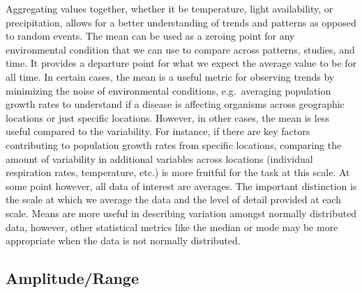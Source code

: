 \documentclass[12pt,twoside]{reedthesis}
\begin{document}
Aggregating values together, whether it be temperature, light availability, or precipitation, allows for a better understanding of trends and patterns as opposed to random events. The mean can be used as a zeroing point for any environmental condition that we can use to compare across patterns, studies, and time. It provides a departure point for what we expect the average value to be for all time. In certain cases, the mean is a useful metric for observing trends by minimizing the noise of environmental conditions, e.g.~averaging population growth rates to understand if a disease is affecting organisms across geographic locations or just specific locations. However, in other cases, the mean is less useful compared to the variability. For instance, if there are key factors contributing to population growth rates from specific locations, comparing the amount of variability in additional variables across locations (individual respiration rates, temperature, etc.) is more fruitful for the task at this scale. At some point however, all data of interest are averages. The important distinction is the scale at which we average the data and the level of detail provided at each scale. Means are more useful in describing variation amongst normally distributed data, however, other statistical metrics like the median or mode may be more appropriate when the data is not normally distributed.

\hypertarget{amplituderange}{%
\subsection{Amplitude/Range}\label{amplituderange}}
\end{document}
